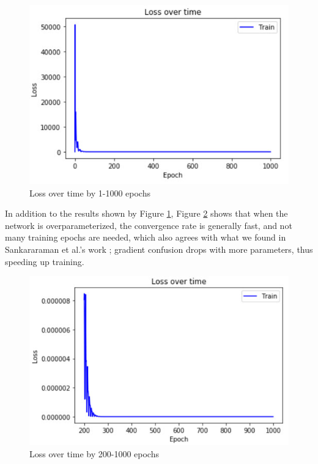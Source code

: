 \documentclass{article}
\begin{document}
\begin{figure}[htb]
	\centering
    \includegraphics[scale = 0.5]{pics/overparameterization/loss_over_time_0-1k.jpg}
    \caption{Loss over time by 1-1000 epochs}
	\label{fig:zeroloss}
\end{figure}

In addition to the results shown by Figure \ref{fig:zeroloss}, Figure \ref{fig:twohundredloss} shows that when the network is overparameterized, the convergence rate is generally fast, and not many training epochs are needed, which also agrees with what we found in Sankararaman et al.'s work \cite{gradient_confusion}; gradient confusion drops with more parameters, thus speeding up training.

\begin{figure}[htb]
	\centering
    \includegraphics[scale = 0.5]{pics/overparameterization/loss_over_time_200-1k.jpg}
    \caption{Loss over time by 200-1000 epochs}
	\label{fig:twohundredloss}
\end{figure}
\end{document}

